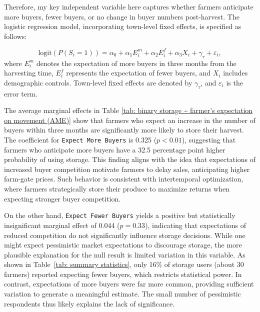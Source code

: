 Therefore, my key independent variable here captures whether farmers anticipate more buyers, fewer buyers, or no change in buyer numbers post-harvest. The logistic regression model, incorporating town-level fixed effects, is specified as follows:

\begin{equation}
    \text{logit} \left( P(S_i = 1) \right) = \alpha_0 + \alpha_1 E^m_i + \alpha_2 E^f_i + \alpha_3 X_i + \gamma_\tau + \varepsilon_i,
\end{equation}
where $E^m_i$ denotes the expectation of more buyers in three months from the harvesting time, $E^f_i$ represents the expectation of fewer buyers, and $X_i$ includes demographic controls. Town-level fixed effects are denoted by $\gamma_\tau$, and $\varepsilon_i$ is the error term.





The average marginal effects in Table \ref{tab: binary storage ~ farmer's expectation on movement (AME)} show that farmers who expect an increase in the number of buyers within three months are significantly more likely to store their harvest. The coefficient for \texttt{Expect More Buyers} is 0.325 (\(p < 0.01\)), suggesting that farmers who anticipate more buyers have a 32.5 percentage point higher probability of using storage. This finding aligns with the idea that expectations of increased buyer competition motivate farmers to delay sales, anticipating higher farm-gate prices. Such behavior is consistent with intertemporal optimization, where farmers strategically store their produce to maximize returns when expecting stronger buyer competition.  

On the other hand, \texttt{Expect Fewer Buyers} yields a positive but statistically insignificant marginal effect of 0.044 ($p = 0.33$), indicating that expectations of reduced competition do not significantly influence storage decisions. While one might expect pessimistic market expectations to discourage storage, the more plausible explanation for the null result is limited variation in this variable. As shown in Table~\ref{tab: summary statistics}, only 16\% of storage users (about 30 farmers) reported expecting fewer buyers, which restricts statistical power. In contrast, expectations of more buyers were far more common, providing sufficient variation to generate a meaningful estimate. The small number of pessimistic respondents thus likely explains the lack of significance.

